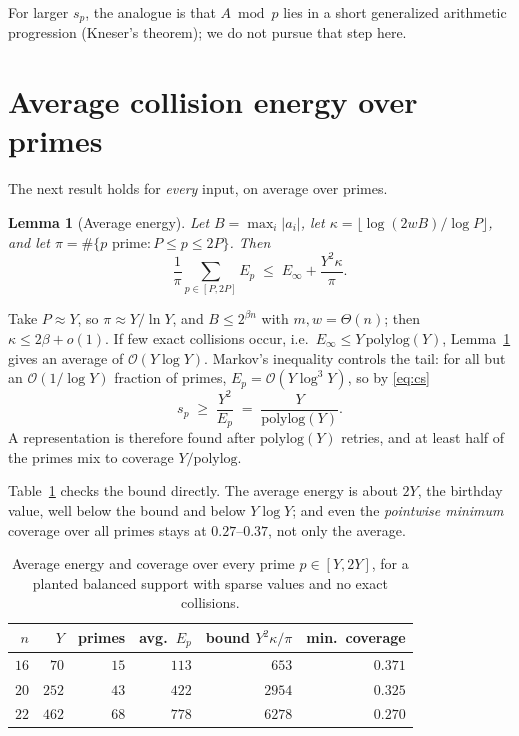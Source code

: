 \documentclass[conference]{IEEEtran}
\newtheorem{lemma}{Lemma}
\newcommand{\Oh}{\mathcal{O}}
\begin{document}
For larger $s_p$, the analogue is that $A\bmod p$ lies in a short generalized
arithmetic progression (Kneser's theorem); we do not pursue that step here.

\section{Average collision energy over primes}\label{sec:energy}
The next result holds for \emph{every} input, on average over primes.

\begin{lemma}[Average energy]\label{lem:avg}
Let $B=\max_i|a_i|$, let $\kappa=\lfloor\log(2wB)/\log P\rfloor$, and let
$\pi=\#\{p\text{ prime}:P\le p\le2P\}$. Then
\[
\frac1\pi\sum_{p\in[P,2P]}E_p \;\le\; E_\infty+\frac{Y^2\kappa}{\pi}.
\]
\end{lemma}

Take $P\approx Y$, so $\pi\approx Y/\ln Y$, and $B\le2^{\beta n}$ with
$m,w=\Theta(n)$; then $\kappa\le2\beta+o(1)$. If few exact collisions occur,
i.e.\ $E_\infty\le Y\,\mathrm{polylog}(Y)$, Lemma~\ref{lem:avg} gives an average
of $\Oh(Y\log Y)$. Markov's inequality controls the tail: for all but an
$\Oh(1/\log Y)$ fraction of primes, $E_p=\Oh(Y\log^3Y)$, so by \eqref{eq:cs}
\begin{equation}\label{eq:cov}
s_p\;\ge\;\frac{Y^2}{E_p}\;=\;\frac{Y}{\mathrm{polylog}(Y)} .
\end{equation}
A representation is therefore found after $\mathrm{polylog}(Y)$ retries, and at
least half of the primes mix to coverage $Y/\mathrm{polylog}$.

Table~\ref{tab:energy} checks the bound directly. The average energy is about
$2Y$, the birthday value, well below the bound and below $Y\log Y$; and even the
\emph{pointwise minimum} coverage over all primes stays at $0.27$--$0.37$, not
only the average.

\begin{table}[t]
\centering
\caption{Average energy and coverage over every prime $p\in[Y,2Y]$, for a
planted balanced support with sparse values and no exact collisions.}
\label{tab:energy}
\begin{tabular}{rrrrrr}
\toprule
$n$ & $Y$ & primes & avg.\ $E_p$ & bound $Y^2\kappa/\pi$ & min.\ coverage\\
\midrule
$16$ & $70$  & $15$ & $113$ & $653$  & $0.371$\\
$20$ & $252$ & $43$ & $422$ & $2954$ & $0.325$\\
$22$ & $462$ & $68$ & $778$ & $6278$ & $0.270$\\
\bottomrule
\end{tabular}
\end{table}
\end{document}

